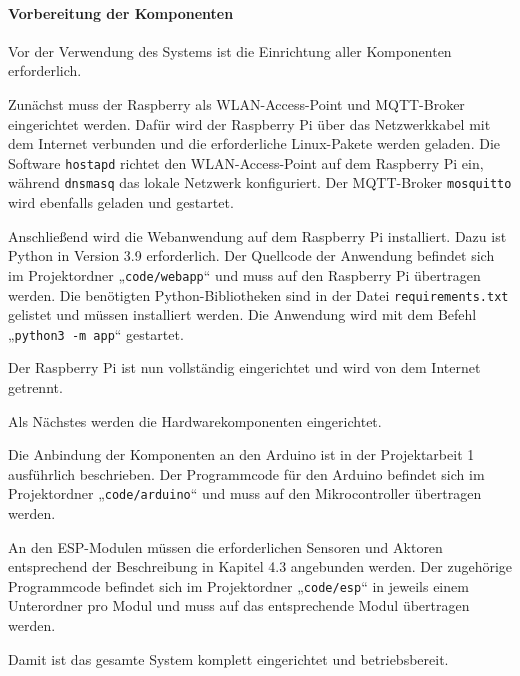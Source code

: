 \documentclass[12pt, letterpaper]{article}
\begin{document}
\paragraph{Vorbereitung der Komponenten}
\par \textbf{}
\par Vor der Verwendung des Systems ist die Einrichtung aller Komponenten erforderlich. 
\par Zunächst muss der Raspberry als WLAN-Access-Point und MQTT-Broker eingerichtet werden. Dafür wird der Raspberry Pi über das Netzwerkkabel mit dem Internet verbunden und die erforderliche Linux-Pakete werden geladen. Die Software \texttt{hostapd} \cite{hostapd} richtet den WLAN-Access-Point auf dem Raspberry Pi ein, während \texttt{dnsmasq} \cite{dnsmasq} das lokale Netzwerk konfiguriert. Der MQTT-Broker \texttt{mosquitto} \cite{mosquitto} wird ebenfalls geladen und gestartet. 
\par Anschließend wird die Webanwendung auf dem Raspberry Pi installiert. Dazu ist Python in Version 3.9 erforderlich. Der Quellcode der Anwendung befindet sich im Projektordner „\texttt{code/webapp}“ und muss auf den Raspberry Pi übertragen werden. Die benötigten Python-Bibliotheken sind in der Datei \texttt{requirements.txt} gelistet und müssen installiert werden. Die Anwendung wird mit dem Befehl „\texttt{python3 -m app}“ gestartet.
\par Der Raspberry Pi ist nun vollständig eingerichtet und wird von dem Internet getrennt.
\par Als Nächstes werden die Hardwarekomponenten eingerichtet. 
\par Die Anbindung der Komponenten an den Arduino ist in der Projektarbeit 1 \cite{pa1} ausführlich beschrieben. Der Programmcode für den Arduino befindet sich im Projektordner „\texttt{code/arduino}“ und muss auf den Mikrocontroller übertragen werden.
\par An den ESP-Modulen müssen die erforderlichen Sensoren und Aktoren entsprechend der Beschreibung in Kapitel 4.3 angebunden werden. Der zugehörige Programmcode befindet sich im Projektordner „\texttt{code/esp}“ in jeweils einem Unterordner pro Modul und muss auf das entsprechende Modul übertragen werden.
\par Damit ist das gesamte System komplett eingerichtet und betriebsbereit.
\end{document}
